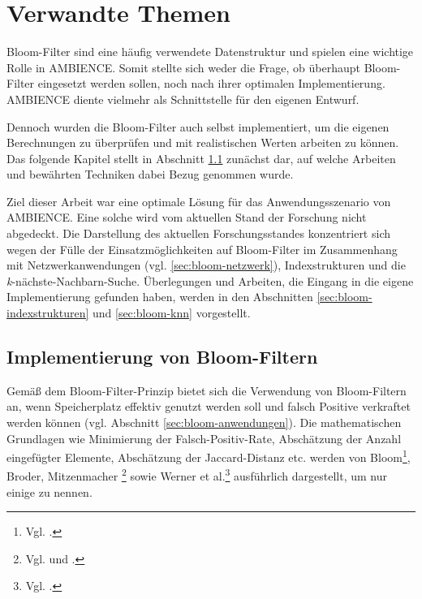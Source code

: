 \chapter{Verwandte Themen}\label{ch:related}
Bloom-Filter sind eine häufig verwendete Datenstruktur und spielen eine wichtige Rolle in AMBIENCE. Somit stellte sich weder die Frage, ob überhaupt Bloom-Filter eingesetzt werden sollen, noch nach ihrer optimalen Implementierung. AMBIENCE diente vielmehr als Schnittstelle für den eigenen Entwurf. 

Dennoch wurden die Bloom-Filter auch selbst implementiert, um die eigenen Berechnungen zu überprüfen und mit realistischen Werten arbeiten zu können. Das folgende Kapitel stellt in Abschnitt \ref{sec:bloom-implementierung} zunächst dar, auf welche Arbeiten und bewährten Techniken dabei Bezug genommen wurde. 

Ziel dieser Arbeit war eine optimale Lösung für das Anwendungsszenario von AMBIENCE. Eine solche wird vom aktuellen Stand der Forschung nicht abgedeckt. Die Darstellung des aktuellen Forschungsstandes konzentriert  sich wegen der Fülle der Einsatzmöglichkeiten auf Bloom-Filter im Zusammenhang mit Netzwerkanwendungen (vgl. \ref{sec:bloom-netzwerk}), Indexstrukturen und die \textit{k}-nächste-Nachbarn-Suche. Überlegungen und Arbeiten, die Eingang in die eigene Implementierung gefunden haben, werden in den Abschnitten \ref{sec:bloom-indexstrukturen} und \ref{sec:bloom-knn} vorgestellt. 
\section{Implementierung von Bloom-Filtern}\label{sec:bloom-implementierung}
Gemäß dem Bloom-Filter-Prinzip bietet sich die Verwendung von Bloom-Filtern an, wenn Speicherplatz effektiv genutzt werden soll und falsch Positive verkraftet werden können (vgl. Abschnitt \ref{sec:bloom-anwendungen}). Die mathematischen Grundlagen wie Minimierung der Falsch-Positiv-Rate, Abschätzung der Anzahl eingefügter Elemente, Abschätzung der Jaccard-Distanz etc. werden von Bloom\footnote{Vgl. \cite{Bloom1970}.}, Broder, Mitzenmacher \footnote{Vgl. \cite{Broder2004} und \cite{Mitzenmacher2002}.} sowie Werner et al.\footnote{Vgl. \cite{Werner2015}.} ausführlich dargestellt, um nur einige zu nennen. 

